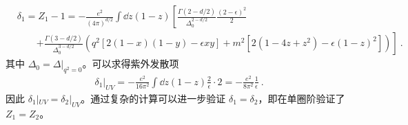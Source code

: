 \begin{equation}
\begin{aligned}
&\delta_1 = Z_1-1 = -\frac{e^2}{(4\pi)^{d/2}}\int\dd z(1-z)\left[\frac{\Gamma(2-d/2)}{\Delta_0^{2-d/2}}\frac{(2-\epsilon)^2}{2}\right.\\
&\quad\quad\left.+\frac{\Gamma(3-d/2)}{\Delta_0^{3-d/2}}(q^2[2(1-x)(1-y)-\epsilon xy]+m^2[2(1-4z+z^2)-\epsilon(1-z)^2])
\right]~.
\end{aligned}
\end{equation}
其中 $\Delta_0 = \Delta|_{q^2=0}$。可以求得紫外发散项
\begin{equation}
\begin{aligned}
\delta_1|_{UV}=-\frac{e^2}{16\pi^2}\int \dd z (1-z) \frac{2}{\epsilon} \cdot 2 = -\frac{e^2}{8\pi^2}\frac{1}{\epsilon}~.
\end{aligned}
\end{equation}
因此 $\delta_1|_{UV}=\delta_2|_{UV}$。通过复杂的计算可以进一步验证 $\delta_1=\delta_2$，即在单圈阶验证了 $Z_1=Z_2$。
